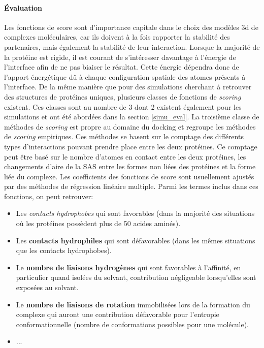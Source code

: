 \paragraph{Évaluation}

Les fonctions de score sont d'importance capitale dans le choix des modèles 3d de complexes moléculaires, car ils doivent à la fois rapporter la stabilité des partenaires, mais également la stabilité de leur interaction. Lorsque la majorité de la protéine est rigide, il est courant de s'intéresser davantage à l'énergie de l'interface afin de ne pas biaiser le résultat. Cette énergie dépendra donc de l'apport énergétique dû à chaque configuration spatiale des atomes présents à l'interface. De la même manière que pour des simulations cherchant à retrouver des structures de protéines uniques, plusieurs classes de fonctions de \textit{scoring} existent. Ces classes sont au nombre de 3 dont 2 existent également pour les simulations et ont été abordées dans la section \ref{simu_eval}. La troisième classe de méthodes de \textit{scoring} est propre au domaine du docking et regroupe les méthodes de \textit{scoring} empiriques.
Ces méthodes se basent sur le comptage des différents types d'interactions pouvant prendre place entre les deux protéines. Ce comptage peut être basé sur le nombre d'atomes en contact entre les deux protéines, les changements d'aire de la SAS entre les formes non liées des protéines et la forme liée du complexe. Les coefficients des fonctions de score sont usuellement ajustés par des méthodes de régression linéaire multiple. Parmi les termes inclus dans ces fonctions, on peut retrouver:

\begin{itemize}
	\item Les \textit{contacts hydrophobes} qui sont favorables (dans la majorité des situations où les protéines possèdent plus de 50 acides aminés).
	\item Les \textbf{contacts hydrophiles} qui sont défavorables (dans les mêmes situations que les contacts hydrophobes).
	\item Le \textbf{nombre de liaisons hydrogènes} qui sont favorables à l'affinité, en particulier quand isolées du solvant, contribution négligeable lorsqu'elles sont exposées au solvant.
	\item Le \textbf{nombre de liaisons de rotation} immobilisées lors de la formation du complexe qui auront une contribution défavorable pour l'entropie conformationnelle (nombre de conformations possibles pour une molécule).
	\item ...
\end{itemize}

